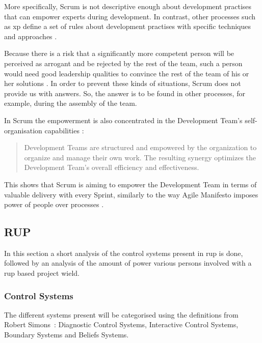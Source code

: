 More specifically, Scrum is not descriptive enough about development practises that can empower experts during development. In contrast, other processes such as \acrfull{xp} define a set of rules about development practises with specific techniques and approaches \citep{www:www.extremeprogramming.org}. 

Because there is a risk that a significantly more competent person will be perceived as arrogant and be rejected by the rest of the team, such a person would need good leadership qualities to convince the rest of the team of his or her solutions \citep[page 116]{debuggingteams}.
In order to prevent these kinds of situations, Scrum does not provide us with answers.
So, the answer is to be found in other processes, for example, during the assembly of the team.

In Scrum the empowerment is also concentrated in the Development Team's self-organisation capabilities \citep[page 5]{schwaber2011scrum}:

\begin{quote}
Development Teams are structured and empowered by the organization to organize and manage their own work. The resulting synergy optimizes the Development Team’s overall efficiency and effectiveness.
\end{quote}

This shows that Scrum is aiming to empower the Development Team in terms of valuable delivery with every Sprint, similarly to the way Agile Manifesto imposes power of people over processes \citep{www:www.agilemanifesto.org}.

\subsection{RUP}
In this section a short analysis of the control systems present in \ac{rup} is done, followed by an analysis of the amount of power various persons involved with a \ac{rup} based project wield.

\subsubsection{Control Systems}
The different systems present will be categorised using the definitions from Robert Simons~\citep{simons1995control}: Diagnostic Control Systems, Interactive Control Systems, Boundary Systems and Beliefs Systems.

